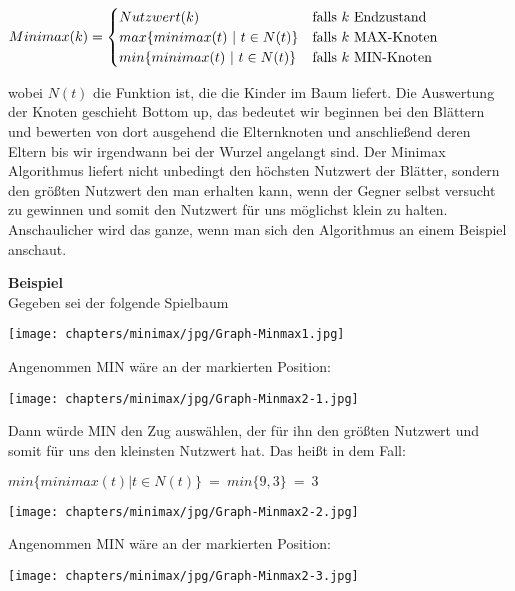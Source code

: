 \begin{center}
	$Minimax(k) = \begin{cases} Nutzwert(k) & \mathrm{falls}~k~\mathrm{Endzustand}\\
		max\{minimax(t) ~|~ t \in N(t)\} 	& \mathrm{falls}~k~\mathrm{MAX\hbox{-}Knoten}\\
		min\{minimax(t) ~|~ t \in N(t)\}	& \mathrm{falls}~k~\mathrm{MIN\hbox{-}Knoten}	\end{cases} $
\end{center}

wobei $N(t)$ die Funktion ist, die die Kinder im Baum liefert. Die Auswertung der Knoten geschieht Bottom up, das bedeutet wir beginnen bei den Blättern und bewerten von dort ausgehend die Elternknoten und anschließend deren Eltern bis wir irgendwann bei der Wurzel angelangt sind. Der Minimax Algorithmus liefert nicht unbedingt den höchsten Nutzwert der Blätter, sondern den größten Nutzwert den man erhalten kann, wenn der Gegner selbst versucht zu gewinnen und somit den Nutzwert für uns möglichst klein zu halten.\\

Anschaulicher wird das ganze, wenn man sich den Algorithmus an einem Beispiel anschaut.

\textbf{Beispiel}\\

Gegeben sei der folgende Spielbaum
\begin{center}
\texttt{[image: chapters/minimax/jpg/Graph-Minmax1.jpg]}
\end{center}

Angenommen MIN wäre an der markierten Position:
\begin{center}
	\texttt{[image: chapters/minimax/jpg/Graph-Minmax2-1.jpg]}
\end{center}

Dann würde MIN den Zug auswählen, der für ihn den größten Nutzwert und somit für uns den kleinsten Nutzwert hat. Das heißt in dem Fall:
\begin{center}
	 $min\{minimax(t) | t \in N(t)\} ~=~ min\{9,3\} ~=~ 3$

\texttt{[image: chapters/minimax/jpg/Graph-Minmax2-2.jpg]}
\end{center}

Angenommen MIN wäre an der markierten Position:
\begin{center}
	\texttt{[image: chapters/minimax/jpg/Graph-Minmax2-3.jpg]}
\end{center}


